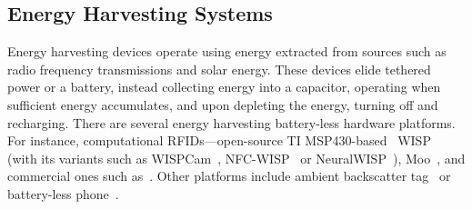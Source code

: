 \subsection{Energy Harvesting Systems}
\label{sec:background_harvesting}

Energy harvesting devices operate using energy extracted from sources such as
radio frequency transmissions and solar energy. These devices elide tethered
power or a battery, instead collecting energy into a capacitor, operating when
sufficient energy accumulates, and upon depleting the energy, turning off and
recharging.
%
%
%
There are several energy harvesting battery-less hardware platforms. For
instance, computational RFIDs---open-source TI MSP430-based~\cite{wolverine}
WISP~\cite{wisp5} (with its variants such as
WISPCam~\cite{naderiparizi_rfid_2015}, NFC-WISP~\cite{zhao_rfid_2015} or
NeuralWISP~\cite{holleman_biocas_2008}), Moo~\cite{moo}, and commercial ones
such as~\cite{medusa_farsens_2017}. Other platforms include ambient backscatter
tag~\cite{liu_sigcomm_2013,parks_sigcomm_2014} or battery-less
phone~\cite{talla_imwut_2017}. 



